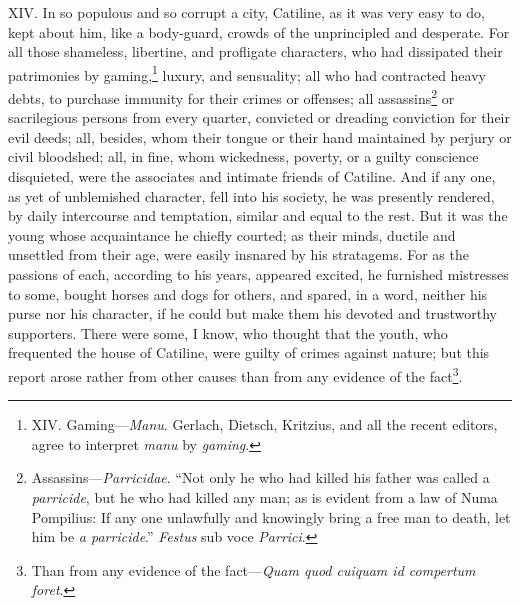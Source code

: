 XIV. In so populous and so corrupt a city, Catiline, as it was very
easy to do, kept about him, like a body-guard, crowds of the
unprincipled and desperate. For all those shameless, libertine, and
profligate characters, who had dissipated their patrimonies by
gaming,\footnote{XIV. Gaming—\emph{Manu}. Gerlach, Dietsch, Kritzius, and all the
recent editors, agree to interpret \emph{manu} by \emph{gaming}.} luxury, and sensuality; all who had contracted heavy
debts, to purchase immunity for their crimes or offenses; all
assassins\footnote{Assassins—\emph{Parricidae}. ``Not only he who had killed his father
was called a \emph{parricide}, but he who had killed any man; as is
evident from a law of Numa Pompilius: If any one unlawfully and
knowingly bring a free man to death, let him be \emph{a parricide}.''
\emph{Festus} sub voce \emph{Parrici}.} or sacrilegious persons from every quarter, convicted or
dreading conviction for their evil deeds; all, besides, whom their
tongue or their hand maintained by perjury or civil bloodshed; all, in
fine, whom wickedness, poverty, or a guilty conscience disquieted,
were the associates and intimate friends of Catiline. And if any one,
as yet of unblemished character, fell into his society, he was
presently rendered, by daily intercourse and temptation, similar and
equal to the rest. But it was the young whose acquaintance he chiefly
courted; as their minds, ductile and unsettled from their age, were
easily insnared by his stratagems. For as the passions of each,
according to his years, appeared excited, he furnished mistresses to
some, bought horses and dogs for others, and spared, in a word,
neither his purse nor his character, if he could but make them his
devoted and trustworthy supporters. There were some, I know, who
thought that the youth, who frequented the house of Catiline, were
guilty of crimes against nature; but this report arose rather from
other causes than from any evidence of the fact\footnote{Than from any evidence of the fact—\emph{Quam quod cuiquam id
compertum foret}.}.

